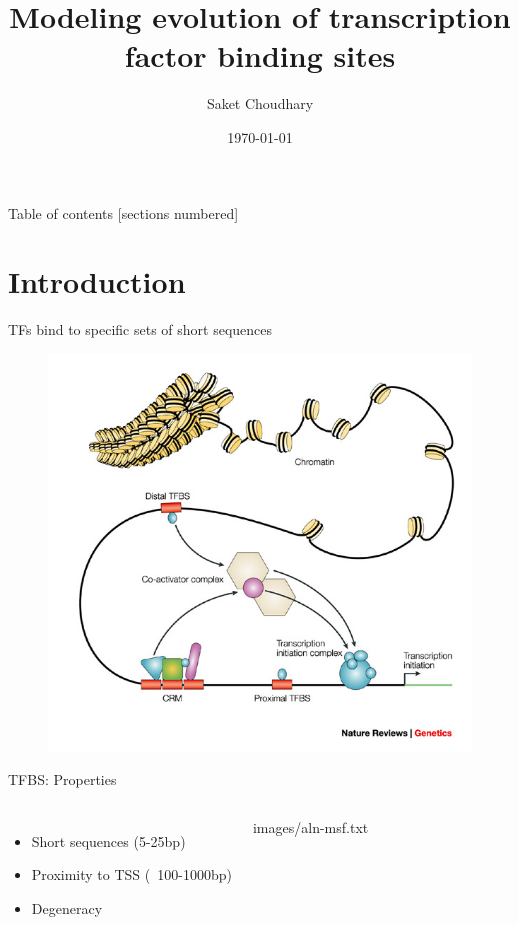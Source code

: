 \documentclass[10pt]{beamer}
\title{Modeling evolution of transcription factor binding sites}
\subtitle{}
\date{\today}
\author{Saket Choudhary}
\begin{document}
\maketitle

\begin{frame}{Table of contents}
  [sections numbered]
  \tableofcontents[hideallsubsections]
\end{frame}

\section{Introduction}
{
\begin{frame}[fragile]{TFs bind to specific sets of short sequences}
  \begin{figure}
	  \includegraphics[width=0.8\linewidth]{images/crm.jpg}
  \end{figure}
\end{frame}
}

\begin{frame}[fragile]{TFBS: Properties}
  \begin{columns}[T,onlytextwidth]
    \begin{itemize}[<+- | alert@+>]
    	\item Short sequences (5-25bp)
  	  	\item Proximity to TSS (~100-1000bp)
   		\item Degeneracy
    \end{itemize}
	\begin{texshade}{images/aln-msf.txt}
      \hidenumbering
	\end{texshade}
  \end{columns}
\end{frame}
\end{document}
